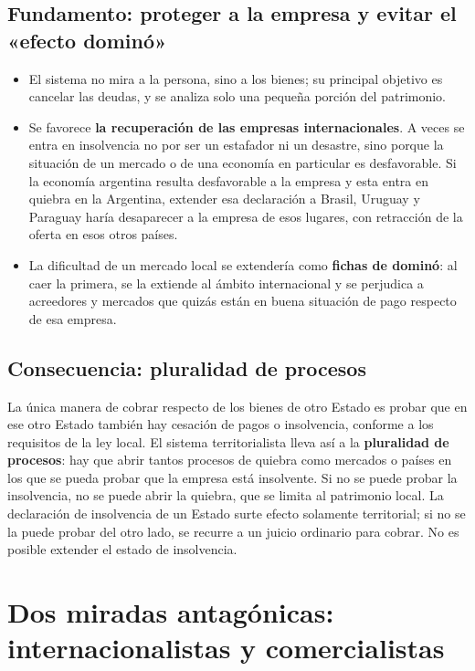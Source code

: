 \documentclass[12pt,oneside]{book}
\begin{document}
\subsection{Fundamento: proteger a la empresa y evitar el «efecto dominó»}

\begin{itemize}
    \item El sistema no mira a la persona, sino a los bienes; su principal objetivo es cancelar las deudas, y se analiza solo una pequeña porción del patrimonio.
    \item Se favorece \textbf{la recuperación de las empresas internacionales}. A veces se entra en insolvencia no por ser un estafador ni un desastre, sino porque la situación de un mercado o de una economía en particular es desfavorable. Si la economía argentina resulta desfavorable a la empresa y esta entra en quiebra en la Argentina, extender esa declaración a Brasil, Uruguay y Paraguay haría desaparecer a la empresa de esos lugares, con retracción de la oferta en esos otros países.
    \item La dificultad de un mercado local se extendería como \textbf{fichas de dominó}: al caer la primera, se la extiende al ámbito internacional y se perjudica a acreedores y mercados que quizás están en buena situación de pago respecto de esa empresa.
\end{itemize}

\subsection{Consecuencia: pluralidad de procesos}

La única manera de cobrar respecto de los bienes de otro Estado es probar que en ese otro Estado también hay cesación de pagos o insolvencia, conforme a los requisitos de la ley local. El sistema territorialista lleva así a la \textbf{pluralidad de procesos}: hay que abrir tantos procesos de quiebra como mercados o países en los que se pueda probar que la empresa está insolvente. Si no se puede probar la insolvencia, no se puede abrir la quiebra, que se limita al patrimonio local. La declaración de insolvencia de un Estado surte efecto solamente territorial; si no se la puede probar del otro lado, se recurre a un juicio ordinario para cobrar. No es posible extender el estado de insolvencia.

\section{Dos miradas antagónicas: internacionalistas y comercialistas}
\end{document}
